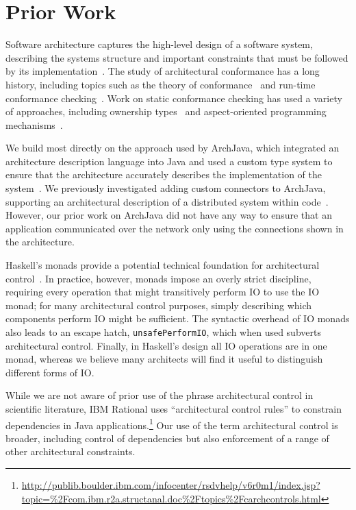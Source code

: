 \documentclass[runningheads]{llncs}
\begin{document}
\begin{sloppypar}
\section{Prior Work}

Software architecture captures the high-level design of a software system, describing the systems structure and important constraints that must be followed by its implementation~\cite{SG96,PW92}.  The study of architectural conformance has a long history, including topics such as the theory of conformance~\cite{MQR95} and run-time conformance checking~\cite{LV95}.  Work on static conformance checking has used a variety of approaches, including ownership types~\cite{AA09b} and aspect-oriented programming mechanisms~\cite{Merson-AOP-arch}.

We build most directly on the approach used by ArchJava, which integrated an architecture description language into Java and used a custom type system to ensure that the architecture accurately describes the implementation of the system~\cite{ACN02}.  We previously investigated adding custom connectors to ArchJava, supporting an architectural description of a distributed system within code~\cite{ASCN03}.  However, our prior work on ArchJava did not have any way to ensure that an application communicated over the network only using the connections shown in the architecture.

Haskell's monads provide a potential technical foundation for architectural control~\cite{Wadler:1992:EFP:143165.143169}.  In practice, however, monads impose an overly strict discipline, requiring every operation that might transitively perform IO to use the IO monad; for many architectural control purposes, simply describing which components perform IO might be sufficient.  The syntactic overhead of IO monads also leads to an escape hatch, \texttt{unsafePerformIO}, which when used subverts architectural control.  Finally, in Haskell's design all IO operations are in one monad, whereas we believe many architects will find it useful to distinguish different forms of IO.
 
While we are not aware of prior use of the phrase architectural control
in scientific literature, IBM Rational uses ``architectural control rules''
to constrain dependencies in Java applications.\footnote{\url{http://publib.boulder.ibm.com/infocenter/rsdvhelp/v6r0m1/index.jsp?topic=\%2Fcom.ibm.r2a.structanal.doc\%2Ftopics\%2Fcarchcontrols.html}}
Our use of the term architectural control is broader, including control of dependencies but also enforcement of a range of other architectural constraints.


\end{sloppypar}
\end{document}
